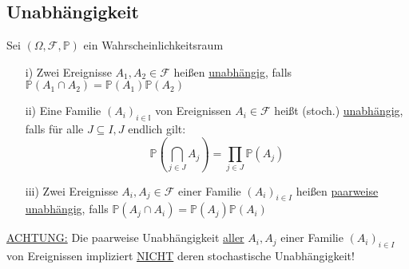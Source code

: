 \subsection{Unabhängigkeit}
\begin{Def}
Sei $ (\Omega,\mathcal F,\mathbb P) $ ein Wahrscheinlichkeitsraum
\begin{itemize}
\item[i)] Zwei Ereignisse $ A_{1},A_{2}\in\mathcal F $ heißen \underline{unabhängig}, falls $ \mathbb P(A_{1}\cap A_{2})=\mathbb P(A_{1})\mathbb{P}(A_{2}) $
\item[ii)] Eine Familie $ (A_{i})_{i\in\mathbb I} $ von Ereignissen $ A_{i}\in\mathcal F $ heißt (stoch.) \underline{unabhängig}, falls für alle $ J\subseteq I , J$ endlich gilt: 
\[ \mathbb{P}(\bigcap\limits_{j\in J} A_{j})=\prod\limits_{j\in J} \mathbb{P}(A_{j}) \]
\item[iii)] Zwei Ereignisse $ A_{i},A_{j}\in\mathcal F $ einer Familie $ (A_{i})_{i\in I} $ heißen \underline{paarweise unabhängig}, falls $ \mathbb{P}(A_{j}\cap A_{i})=\mathbb{P}(A_{j})\mathbb{P}(A_{i}) $
\end{itemize}
\underline{ACHTUNG:} Die paarweise Unabhängigkeit \underline{aller} $ A_{i},A_{j} $ einer Familie $ (A_{i})_{i\in I} $ von Ereignissen impliziert \underline{NICHT} deren stochastische Unabhängigkeit!
\end{Def}
